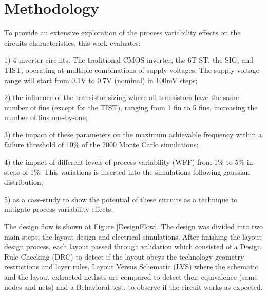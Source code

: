 \documentclass[pgmicro,diss,english]{iiufrgs}
\begin{document}

\chapter{Methodology}

To provide an extensive exploration of the process variability effects on the circuits characteristics, this work evaluates:

1) 4 inverter circuits. The traditional CMOS inverter, the 6T ST, the SIG, and TIST, operating at multiple combinations of supply voltages. The supply voltage range will start from 0.1V to 0.7V (nominal) in 100mV steps;

2) the influence of the transistor sizing where all transistors have the same number of fins (except for the TIST), ranging from 1 fin to 5 fins, increasing the number of fins one-by-one;

3) the impact of these parameters on the maximum achievable frequency within a failure threshold of 10\% of the 2000 Monte Carlo simulations;

4) the impact of different levels of process variability (WFF) from 1\% to 5\% in steps of 1\%. This variations is inserted into the simulations following gaussian distribution;

5) as a case-study to show the potential of these circuits as a technique to mitigate process variability effects.

The design flow is shown at Figure \ref{DesignFlow}. The design was divided into two main steps: the layout design and electrical simulations. After finishing the layout design process, each layout passed through validation which consisted of a Design Rule Checking (DRC) to detect if the layout obeys the technology geometry restrictions and layer rules, Layout Versus Schematic (LVS) where the schematic and the layout extracted netlists are compared to detect their equivalence (same nodes and nets) and a Behavioral test, to observe if the circuit works as expected.
\end{document}
